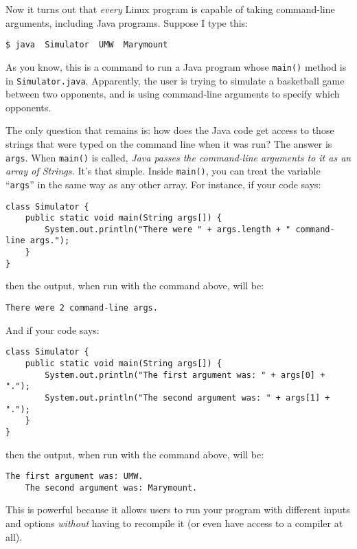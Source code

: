 Now it turns out that \textit{every} Linux program is capable of taking
command-line arguments, including Java programs. Suppose I type this:

\medskip
\quad \texttt{\$ java \ Simulator \ UMW \ Marymount}
\medskip

As you know, this is a command to run a Java program whose \texttt{main()}
method is in \texttt{Simulator.java}. Apparently, the user is trying to
simulate a basketball game between two opponents, and is using command-line
arguments to specify which opponents. 

The only question that remains is: how does the Java code get access to those
strings that were typed on the command line when it was run? The answer is
\texttt{args}. When \texttt{main()} is called, \textit{Java passes the
command-line arguments to it as an array of Strings.} It's that simple. Inside
\texttt{main()}, you can treat the variable ``\texttt{args}'' in the same way
as any other array. For instance, if your code says:

\begin{Verbatim}[fontsize=\footnotesize,samepage=true,frame=single]
class Simulator {
    public static void main(String args[]) {
        System.out.println("There were " + args.length + " command-line args.");
    }
}
\end{Verbatim}

then the output, when run with the command above, will be:

\medskip
\quad \texttt{There were 2 command-line args.}
\medskip

And if your code says:

\begin{Verbatim}[fontsize=\footnotesize,samepage=true,frame=single]
class Simulator {
    public static void main(String args[]) {
        System.out.println("The first argument was: " + args[0] + ".");
        System.out.println("The second argument was: " + args[1] + ".");
    }
}
\end{Verbatim}

then the output, when run with the command above, will be:

\begin{Verbatim}[fontsize=\small,samepage=true,frame=none]
    The first argument was: UMW.
    The second argument was: Marymount.
\end{Verbatim}

This is powerful because it allows users to run your program with different
inputs and options \textit{without} having to recompile it (or even have
access to a compiler at all).

